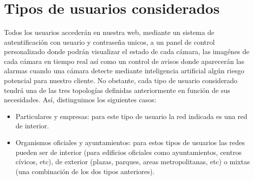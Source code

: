\section{Tipos de usuarios considerados}

\paragraph{}
Todos los usuarios accederán en nuestra web, mediante un sistema de autentificación con usuario y contraseña unicos, a un panel de control
personalizado donde podrán visualizar el estado de cada cámara, las imagénes de cada cámara en tiempo real así como un control de avisos
donde aparecerán las alarmas cuando una cámara detecte mediante inteligencia artificial algún riesgo potencial para nuestro cliente. No obstante, 
cada tipo de usuario considerado tendrá una de las tres topologías definidas anteriormente en función de sus necesidades. Así, distinguimos los siguientes casos:
\begin{itemize}
    \item Particulares y empresas: para este tipo de usuario la red indicada es una red de interior.
    \item Organismos oficiales y ayuntamientos: para estos tipos de usuarios las redes pueden ser de interior (para edificios oficiales como ayuntamientos,
    centros cívicos, etc), de exterior (plazas, parques, areas metropolitanas, etc) o mixtas (una combinación de los dos tipos anteriores).
\end{itemize}